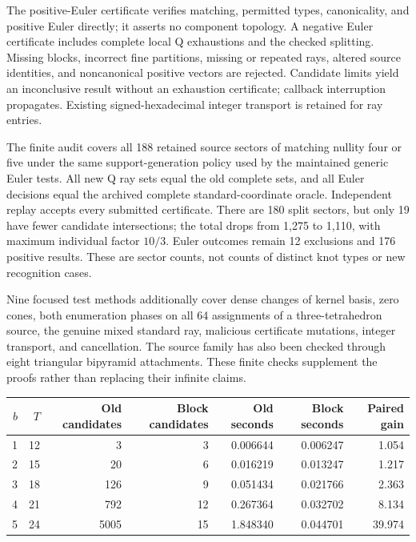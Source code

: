 The positive-Euler certificate verifies matching, permitted types,
canonicality, and positive Euler directly; it asserts no component topology.
A negative Euler certificate includes complete local Q exhaustions and
the checked splitting.  Missing blocks, incorrect fine partitions,
missing or repeated rays, altered source identities, and noncanonical
positive vectors are rejected.  Candidate limits yield an inconclusive
result without an exhaustion certificate; callback interruption propagates.
Existing signed-hexadecimal integer transport is retained for ray entries.

The finite audit covers all 188 retained source sectors of matching
nullity four or five under the same support-generation policy used by the
maintained generic Euler tests.  All new Q ray sets equal the old complete
sets, and all Euler decisions equal the archived complete standard-coordinate
oracle.  Independent replay accepts every submitted certificate.
There are 180 split sectors, but only 19 have fewer candidate intersections;
the total drops from 1,275 to 1,110, with maximum individual factor $10/3$.
Euler outcomes remain 12 exclusions and 176 positive results.  These are
sector counts, not counts of distinct knot types or new recognition cases.

Nine focused test methods additionally cover dense changes of kernel basis,
zero cones, both enumeration phases on all 64 assignments of a three-tetrahedron
source, the genuine mixed standard ray, malicious certificate mutations,
integer transport, and cancellation.  The source family has also been
checked through eight triangular bipyramid attachments.  These finite
checks supplement the proofs rather than replacing their infinite claims.

\begin{center}
\begin{tabular}{r r r r r r r}
\hline
$b$ & $T$ & Old candidates & Block candidates & Old seconds & Block seconds & Paired gain\\
\hline
1 & 12 & 3 & 3 & 0.006644 & 0.006247 & 1.054\\
2 & 15 & 20 & 6 & 0.016219 & 0.013247 & 1.217\\
3 & 18 & 126 & 9 & 0.051434 & 0.021766 & 2.363\\
4 & 21 & 792 & 12 & 0.267364 & 0.032702 & 8.134\\
5 & 24 & 5005 & 15 & 1.848340 & 0.044701 & 39.974\\
\hline
\end{tabular}
\end{center}

